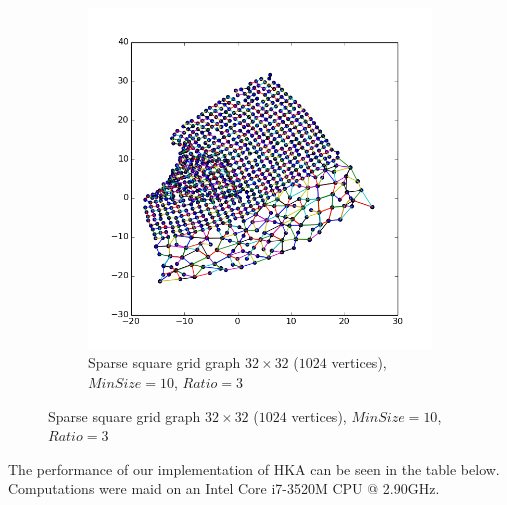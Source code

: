 \documentclass[12pt,a4paper]{article}
\begin{document}
\begin{figure}[htb]
\begin{subfigure}{0.5\textwidth}
           \includegraphics[scale=0.45]{results_Harel/HK_sgrid32x32_m10_r3.png}
            \caption{Sparse square grid graph $32\times 32$ ($1024$ vertices), $MinSize=10$, $Ratio=3$}
     \end{subfigure}
     \label{fig: sgrid}
\end{figure}     

\newpage

The performance of our implementation of HKA can be seen in the table below. Computations were maid on an Intel Core i7-3520M CPU @ 2.90GHz.
\end{document}
